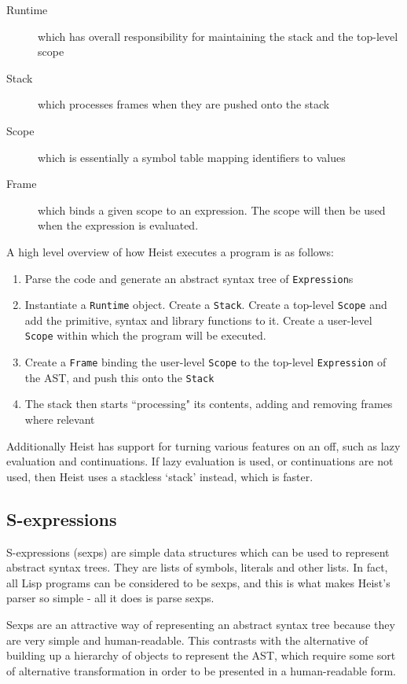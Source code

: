 \begin{description}
	\item[Runtime] which has overall responsibility for maintaining the stack and the top-level scope
	\item[Stack] which processes frames when they are pushed onto the stack
	\item[Scope] which is essentially a symbol table mapping identifiers to values
	\item[Frame] which binds a given scope to an expression. The scope will then be used when the expression is evaluated.
\end{description}

A high level overview of how Heist executes a program is as follows:

\begin{enumerate}
	\item Parse the code and generate an abstract syntax tree of \texttt{Expression}s
	\item Instantiate a \texttt{Runtime} object. Create a \texttt{Stack}. Create a top-level \texttt{Scope} and add the primitive, syntax and library functions to it. Create a user-level \texttt{Scope} within which the program will be executed.
	\item Create a \texttt{Frame} binding the user-level \texttt{Scope} to the top-level \texttt{Expression} of the AST, and push this onto the \texttt{Stack}
	\item The stack then starts ``processing" its contents, adding and removing frames where relevant
\end{enumerate}

Additionally Heist has support for turning various features on an off, such as lazy evaluation and continuations. If lazy evaluation is used, or continuations are not used, then Heist uses a stackless `stack' instead, which is faster.

\subsection{S-expressions}
\label{sec:sexps}

S-expressions (\gls{sexp}s) are simple data structures which can be used to represent abstract syntax trees. They are lists of symbols, literals and other lists. In fact, all Lisp programs can be considered to be sexps, and this is what makes Heist's parser so simple - all it does is parse sexps.

Sexps are an attractive way of representing an abstract syntax tree because they are very simple and human-readable. This contrasts with the alternative of building up a hierarchy of objects to represent the \gls{AST}, which require some sort of alternative transformation in order to be presented in a human-readable form.

